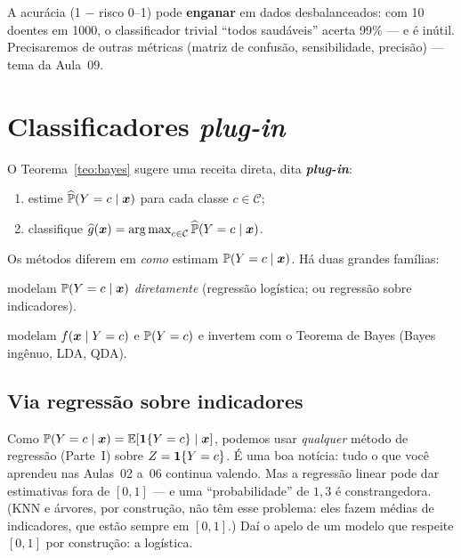 \documentclass[11pt,a4paper]{article}
\begin{document}
\begin{atencao}
A acurácia (1 $-$ risco 0--1) pode \textbf{enganar} em dados desbalanceados: com 10
doentes em 1000, o classificador trivial ``todos saudáveis'' acerta 99\% --- e é
inútil. Precisaremos de outras métricas (matriz de confusão, sensibilidade,
precisão) --- tema da Aula~09.
\end{atencao}

\section{Classificadores \emph{plug-in}}
O Teorema~\ref{teo:bayes} sugere uma receita direta, dita \textbf{\emph{plug-in}}:
\begin{enumerate}[leftmargin=1.6cm,nosep]
  \item estime $\widehat{\mathbb{P}}(Y=c\mid\bm{x})$ para cada classe $c\in\mathcal{C}$;
  \item classifique $\ghat(\x)=\argmax_{c\in\mathcal{C}}\widehat\Prob(Y=c\mid\x)$.
\end{enumerate}
Os métodos diferem em \emph{como} estimam $\mathbb{P}(Y=c\mid\bm{x})$. Há duas grandes
famílias:
\begin{description}[leftmargin=2.6cm,style=nextline]
  \item[Discriminativos] modelam $\mathbb{P}(Y=c\mid\bm{x})$ \emph{diretamente} (regressão
        logística; ou regressão sobre indicadores).
  \item[Generativos] modelam $f(\bm{x}\mid Y=c)$ e $\mathbb{P}(Y=c)$ e invertem com o
        Teorema de Bayes (Bayes ingênuo, LDA, QDA).
\end{description}

\subsection{Via regressão sobre indicadores}
Como $\mathbb{P}(Y=c\mid\bm{x})=\mathbb{E}[\mathbf{1}\!\left\{Y=c\right\}\mid\bm{x}]$, podemos usar \emph{qualquer} método de
regressão (Parte~I) sobre $Z=\mathbf{1}\!\left\{Y=c\right\}$. É uma boa notícia: tudo o que você aprendeu
nas Aulas~02 a~06 continua valendo. Mas a regressão linear pode dar estimativas
fora de $[0,1]$ --- e uma ``probabilidade'' de $1{,}3$ é constrangedora. (KNN e
árvores, por construção, não têm esse problema: eles fazem médias de indicadores,
que estão sempre em $[0,1]$.) Daí o apelo de um modelo que respeite $[0,1]$ por
construção: a logística.
\end{document}
